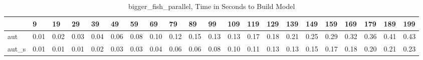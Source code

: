 \begin{table}
\caption{bigger_fish_parallel, Time in Seconds to Build Model}
\label{bigger_fish_parallel_model_time}
\begin{tabular}{lllllllllllllllllllll}
\toprule
 & 9 & 19 & 29 & 39 & 49 & 59 & 69 & 79 & 89 & 99 & 109 & 119 & 129 & 139 & 149 & 159 & 169 & 179 & 189 & 199 \\
\midrule
aut & 0.01 & 0.02 & 0.03 & 0.04 & 0.06 & 0.08 & 0.10 & 0.12 & 0.15 & 0.13 & 0.13 & 0.17 & 0.18 & 0.21 & 0.25 & 0.29 & 0.32 & 0.36 & 0.41 & 0.43 \\
aut_s & 0.01 & 0.01 & 0.01 & 0.02 & 0.03 & 0.03 & 0.04 & 0.06 & 0.06 & 0.08 & 0.10 & 0.11 & 0.13 & 0.13 & 0.15 & 0.17 & 0.18 & 0.20 & 0.21 & 0.23 \\
\bottomrule
\end{tabular}
\end{table}
